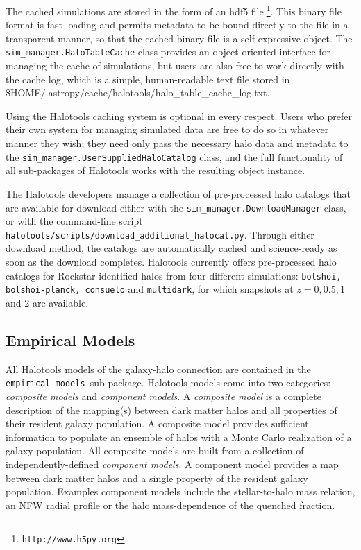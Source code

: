 \documentclass[twocolumn, tighten]{aastex6}
\newcommand{\emodels}{{\tt empirical\_models }}
\begin{document}
The cached simulations are stored in the form of an hdf5 file.\footnote{\tt http://www.h5py.org}\citep{hdf5}. This binary file format is fast-loading and permits metadata to be bound directly to the file in a transparent manner, so that the cached binary file is a self-expressive object. The {\tt sim\_manager.HaloTableCache} class provides an object-oriented interface for managing the cache of simulations, but users are also free to work directly with the cache log, which is a simple, human-readable text file stored in \$HOME/.astropy/cache/halotools/halo\_table\_cache\_log.txt.

Using the Halotools caching system is optional in every respect. Users who prefer their own system for managing simulated data are free to do so in whatever manner they wish; they need only pass the necessary halo data and metadata to the {\tt sim\_manager.UserSuppliedHaloCatalog} class, and the full functionality of all sub-packages of Halotools works with the resulting object instance.  

The Halotools developers manage a collection of pre-processed halo catalogs that are available for download either with the {\tt sim\_manager.DownloadManager} class, or with the command-line script {\tt halotools/scripts/download\_additional\_halocat.py}. Through either download method, the catalogs are automatically cached and science-ready as soon as the download completes. Halotools currently offers pre-processed halo catalogs for Rockstar-identified halos from four different simulations: {\tt bolshoi, bolshoi-planck, consuelo} and {\tt multidark}, for which snapshots at $z=0, 0.5, 1$ and $2$ are available.

\subsection{Empirical Models}
\label{subsection:empirical_models}

All Halotools models of the galaxy-halo connection are contained in the \emodels sub-package. Halotools models come into two categories: {\em composite models} and {\em component models}. 
A {\em composite model} is a complete description of the mapping(s) between dark matter halos and all properties of their resident galaxy population. A composite model provides sufficient information to populate an ensemble of halos with a Monte Carlo realization of a galaxy population. All composite models are built from a collection of independently-defined {\em component models}. A component model provides a map between dark matter halos and a single property of the resident galaxy population. Examples component models include the stellar-to-halo mass relation, an NFW radial profile or the halo mass-dependence of the quenched fraction.
\end{document}
